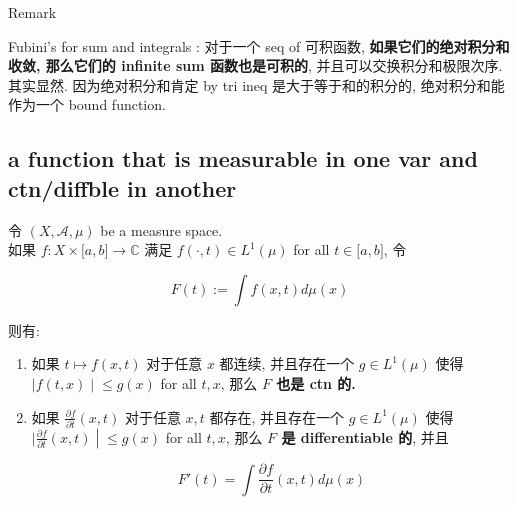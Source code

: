 \documentclass{qlnotes-export}
\begin{document}
\begin{qlremark}{Remark}

Fubini's for sum and integrals : 对于一个 seq of 可积函数, \textbf{如果它们的绝对积分和收敛, 那么它们的 infinite sum 函数也是可积的}, 并且可以交换积分和极限次序.\\
其实显然. 因为绝对积分和肯定 by tri ineq 是大于等于和的积分的, 绝对积分和能作为一个 bound function.

\end{qlremark}

\subsection{a function that is measurable in one var and ctn/diffble in another}\label{a-function-that-is-measurable-in-one-var-and-ctndiffble-in-another}

\begin{corollary}

令 \((X,\mathcal{A},\mu)\) be a measure space.\\
如果 \(f:X \times \lbrack a,b\rbrack\rightarrow{\mathbb{C}}\) 满足 \(f( \cdot ,t) \in L^{1}(\mu)\) for all \(t \in \lbrack a,b\rbrack\), 令

\[F(t) := \int f(x,t) d\mu(x)\]

则有:

\begin{enumerate}
\item
  如果 \(t\mapsto f(x,t)\) 对于任意 \(x\) 都连续, 并且存在一个 \(g \in L^{1}(\mu)\) 使得 \(\left. |f(t,x) \middle| \leq g(x) \right.\) for all \(t,x\), 那么 \textbf{\(F\) 也是 ctn 的.}
\item
  如果 \(\frac{\partial f}{\partial t}(x,t)\) 对于任意 \(x,t\) 都存在, 并且存在一个 \(g \in L^{1}(\mu)\) 使得 \(\left. |\frac{\partial f}{\partial t}(x,t) \middle| \leq g(x) \right.\) for all \(t,x\), 那么 \textbf{\(F\) 是 differentiable 的}, 并且

  \[F'(t) = \int\frac{\partial f}{\partial t}(x,t) d\mu(x)\]
\end{enumerate}

\end{corollary}
\end{document}
